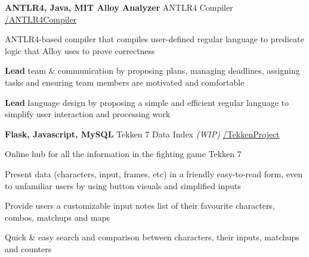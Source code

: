 \begin{cventries}
  \cventry
    {\textbf{ANTLR4, Java, MIT Alloy Analyzer}} %
    {ANTLR4 Compiler} %
    {\href{https://github.com/basulaib/ANTLR4Compiler}{\faGithub /ANTLR4Compiler}} %
    {} %
    {
      \begin{cvitems} %
        \item {ANTLR4-based compiler that compiles user-defined regular language to predicate logic that Alloy uses to prove correctness}
        \item {\textbf{Lead} team \& communication by proposing plans, managing deadlines, assigning tasks and ensuring team members are motivated and comfortable}
        \item {\textbf{Lead} language design by proposing a simple and efficient regular language to simplify user interaction and processing work}
      \end{cvitems}
    }
    
  \cventry
    {\textbf{Flask, Javascript, MySQL}} %
    {Tekken 7 Data Index \textit{(WIP)}} %
    {\href{https://github.com/basulaib/TekkenProject}{\faGithub /TekkenProject}} %
    {} %
    {
      \begin{cvitems} %
        \item {Online hub for all the information in the fighting game Tekken 7}
        \item {Present data (characters, input, frames, etc) in a friendly easy-to-read form, even to unfamiliar users by using button visuals and simplified inputs}
        \item {Provide users a customizable input notes list of their favourite characters, combos, matchups and maps}
        \item {Quick \& easy search and comparison between characters, their inputs, matchups and counters}
      \end{cvitems}
    }
    

\end{cventries}
